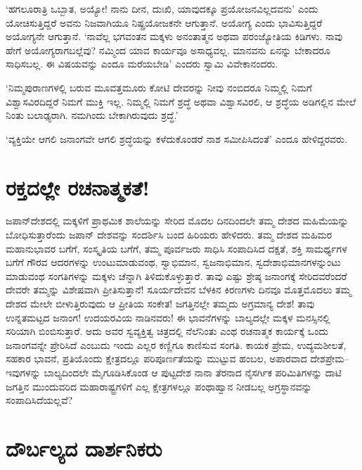 ‘ಹಗಲೂರಾತ್ರಿ ಒಬ್ಬಾತ, ಅಯ್ಯೋ! ನಾನು ದೀನ, ದುಃಖಿ, ಯಾವುದಕ್ಕೂ ಪ್ರಯೋಜನ\-ವಿಲ್ಲದವನು’ ಎಂದು ಯೋಚಿಸುತ್ತಿದ್ದರೆ ಅವನು ನಿಜವಾಗಿಯೂ ನಿಷ್ಪ್ರಯೋಜಕನೇ ಆಗುತ್ತಾನೆ. ಅಯೋಗ್ಯ ಎಂದು ಭಾವಿಸುತ್ತಿದ್ದರೆ ಅಯೋಗ್ಯನೇ ಆಗುತ್ತಾನೆ. ‘ನಾವೆಲ್ಲ ಭಗವಂತನ ಮಕ್ಕಳು ಅನಂತಾತ್ಮನ ಅಥವಾ ಪರಂಜ್ಯೋತಿಯ ಕಿಡಿಗಳು. ನಾವು ಹೇಗೆ ಅಯೋಗ್ಯರಾಗಬಲ್ಲೆವು? ನಮ್ಮಿಂದ ಯಾವ ಕಾರ್ಯವೂ ಅಸಾಧ್ಯವಲ್ಲ. ಮಾನವನು ಏನನ್ನು ಬೇಕಾದರೂ ಸಾಧಿಸಬಲ್ಲ. ಈ ವಿಷಯವನ್ನು ಎಂದೂ ಮರೆಯಬೇಡಿ’ ಎಂದರು ಸ್ವಾಮಿ ವಿವೇಕಾನಂದರು.

‘ನಿಮ್ಮಪುರಾಣಗಳಲ್ಲಿ ಬರುವ ಮೂವತ್ತಮೂರು ಕೋಟಿ ದೇವರನ್ನು ನೀವು ನಂಬಿದರೂ ನಿಮ್ಮಲ್ಲಿ ನಿಮಗೆ ವಿಶ್ವಾಸವಿರದಿದ್ದರೆ ನಿಮಗೆ ಮುಕ್ತಿ ಇಲ್ಲ. ನಿಮ್ಮಲ್ಲಿ ನಿಮಗೆ ಶ್ರದ್ಧೆ ಅಥವಾ ವಿಶ್ವಾಸವಿರಲಿ, ಆ ಶ್ರದ್ಧೆಯ ಅಡಿಗಲ್ಲಿನ ಮೇಲೆ ನಿಂತು ಬಲಾಢ್ಯರಾಗಿ. ನಮಗಿಂದು ಬೇಕಾಗಿರುವುದು ಶ್ರದ್ಧೆ.’

‘ವ್ಯಕ್ತಿಯೇ ಆಗಲಿ ಜನಾಂಗವೇ ಆಗಲಿ ಶ್ರದ್ಧೆಯನ್ನು ಕಳೆದುಕೊಂಡರೆ ನಾಶ ಸಮೀಪಿಸಿದಂತೆ’ ಎಂದೂ ಹೇಳಿದ್ದರವರು.


\section*{ರಕ್ತದಲ್ಲೇ ರಚನಾತ್ಮಕತೆ!}


ಜಪಾನ್​ದೇಶದಲ್ಲಿ ಮಕ್ಕಳಿಗೆ ಪ್ರಾಥಮಿಕ ಶಾಲೆಯನ್ನು ಸೇರಿದ ಮೊದಲ ದಿನದಿಂದಲೇ ತಮ್ಮ ದೇಶದ ಮಹಿಮೆಯನ್ನು ಬೋಧಿಸುತ್ತಾರೆಂದು ಜಪಾನ್ ದೇಶವನ್ನು ಸಂದರ್ಶಿಸಿ ಬಂದ ಹಿರಿಯರು ಹೇಳಿದರು. ತಮ್ಮ ದೇಶದ ಮಹಿಮರ ಮಹಾನುಭಾವರ ಬಗೆಗೆ, ಸಂಸ್ಕೃತಿಯ ಬಗೆಗೆ, ತಮ್ಮ ಪೂರ್ವಜರು ಸಾಧಿಸಿ ಸಂಪಾದಿಸಿದ ದಕ್ಷತೆ, ಶಕ್ತಿ ಸಾಮರ್ಥ್ಯಗಳ ಬಗೆಗೆ ಗೌರವ ಆದರಗಳನ್ನು ಉಂಟುಮಾಡುವಂಥ, ಸ್ವಾಭಿಮಾನ, ಸ್ವಜನಾಭಿಮಾನ, ಸ್ವದೇಶಾಭಿಮಾನಗಳನ್ನುಂಟು ಮಾಡು\-ವಂಥ ಸಂಗತಿಗಳನ್ನು ಮಕ್ಕಳು ಚೆನ್ನಾಗಿ ತಿಳಿದುಕೊಳ್ಳುತ್ತಾರೆ. ತಾವು ಎಷ್ಟು ಶ್ರೇಷ್ಠ ಜನಾಂಗಕ್ಕೆ ಸೇರಿದವರೆಂದರೆ ದೇವರೇ ತಮ್ಮನ್ನು ವಿಶೇಷವಾಗಿ ಪ್ರೀತಿಸುತ್ತಾನೆ! ಸೂರ್ಯದೇವನ ಬೆಳಕಿನ ಕಿರಣಗಳು ದಿನವೂ ಮೊತ್ತಮೊದಲು ತಮ್ಮ ದೇಶದ ಮೇಲೇ ಬೀಳುತ್ತಿರುವುದು ಆ ಪ್ರೀತಿಯ ಸಂಕೇತ! ಜಗತ್ತಿನಲ್ಲೇ ತಮ್ಮದು ಅಗ್ರಮಾನ್ಯ ದೇಶ! ತಾವು ಉನ್ನತಮಟ್ಟದ ಜನಾಂಗ! ಉದಯರವಿಯ ನಾಡಿನವರು! ಈ ಭಾವನೆಗಳನ್ನು ಬಾಲ್ಯದಲ್ಲೇ ಮಕ್ಕಳ ಮನಸ್ಸಿನಲ್ಲಿ ಸರಿಯಾಗಿ ಬಿಂಬಿಸುತ್ತಾರೆ. ಅದು ಅವರ ಸ್ವವ್ಯಕ್ತಿತ್ವ ಚಿತ್ರದಲ್ಲಿ ನೆಲೆನಿಂತು ಎಂಥ ರಚನಾತ್ಮಕ ಕಾರ್ಯಕ್ಕೆ ಒಂದು ಜನಾಂಗವನ್ನೇ ಪ್ರೇರಿಸಿದೆ ಎಂಬುದು ಇಂದು ಎಲ್ಲರ ಕಣ್ಣಿಗೂ ಕಾಣಿಸುವ ಸಂಗತಿ. ಕಾಯಕ ಪ್ರೇಮ, ಉದ್ಯಮಶೀಲತೆ, ಸಹಕಾರ ಭಾವನೆ, ಪ್ರತಿಯೊಂದು ಕ್ಷೇತ್ರದಲ್ಲೂ ಪರಿಪೂರ್ಣತೆಯನ್ನು ಮುಟ್ಟುವ ಹಂಬಲ, ಅಪಾರವಾದ ದೇಶಪ್ರೇಮ–ಇವುಗಳನ್ನು ಬಾಲ್ಯದಿಂದಲೇ ಮೈಗೂಡಿಸಿಕೊಂಡ ಆ ಪುಟ್ಟದೇಶ ನಾನಾ ತೆರನಾದ ನೈಸರ್ಗಿಕ ಪರಿಮಿತಿಗಳನ್ನು ದಾಟಿ ಜಗತ್ತಿನ ಮುಂದುವರಿದ ಮಹಾರಾಷ್ಟ್ರಗಳಿಗೆ ಎಲ್ಲ ಕ್ಷೇತ್ರಗಳಲ್ಲೂ ಪಂಥಾಹ್ವಾನ ನೀಡಬಲ್ಲ ಅಗ್ರಸ್ಥಾನವನ್ನು ಸಂಪಾದಿಸಿದೆಯಲ್ಲವೆ?


\section*{ದೌರ್ಬಲ್ಯದ ದಾರ್ಶನಿಕರು}


